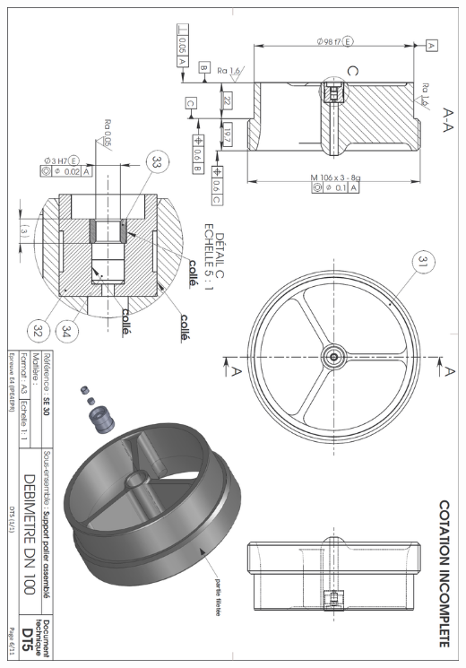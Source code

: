 \documentclass[10pt,fleqn]{article} %
\begin{document}
\begin{center}
\includegraphics[width=\textwidth]{images/debitmetre_07}
\end{center}
\end{document}
